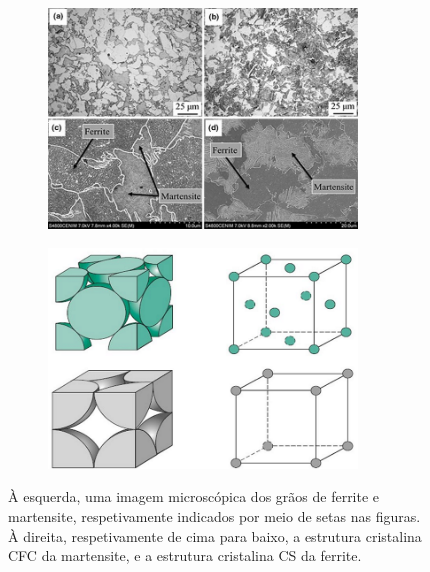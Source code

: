 \begin{figure}[htb]
    \centering
    \begin{subfigure}{.5\textwidth}
      \centering
      \includegraphics[width = 0.9\textwidth]{Figures/Cap2/Ferrite_Martensite.png}
      \caption{}
      \label{fig:Crystal}
    \end{subfigure}%
    \begin{subfigure}{.5\textwidth}
      \centering
      \includegraphics[width = 0.9\textwidth]{Figures/Cap2/CFC_CS.png}
      \caption{}
      \label{fig:CFC_CS}
    \end{subfigure}
\caption[Diferenças entre microestruturas de martensite e ferrite]%
{À esquerda, uma imagem microscópica dos grãos de ferrite e martensite, respetivamente indicados por meio de setas nas figuras. À direita, respetivamente de cima para baixo, a estrutura cristalina CFC da martensite, e a estrutura cristalina CS da ferrite.}
\end{figure}
